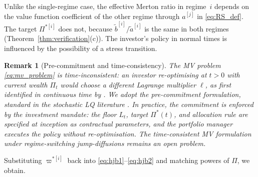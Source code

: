 \documentclass[11pt,a4paper]{article}
\numberwithin{equation}{section}
\newtheorem{remark}[theorem]{Remark}
\begin{document}
Unlike the single-regime case, the effective Merton ratio in regime~$i$ depends on the value function coefficient of the other regime through $a^{[j]}$ in \eqref{eq:RS_def}. The target $\Pi^{*[i]}$ does not, because $\tilde{b}^{[i]}/\tilde{a}^{[i]}$ is the same in both regimes (Theorem~\ref{thm:verification}(c)). The investor's policy in normal times is influenced by the possibility of a stress transition.


\begin{remark}[Pre-commitment and time-consistency]%
\label{rem:time_consistency}
The MV problem \eqref{eq:mv_problem} is time-inconsistent: an investor 
re-optimising at $t > 0$ with current wealth $\Pi_t$ would choose a 
different Lagrange multiplier $\ell$, as first identified in continuous 
time by \citet{BasakChabakauri2010}. We adopt the pre-commitment 
formulation, standard in the stochastic LQ literature 
\citep{ZhouLi2000, ZhouYin2003, ShiXu2025}. In practice, the 
commitment is enforced by the investment mandate: the floor $L_t$, 
target $\Pi^*(t)$, and allocation rule are specified at inception as 
contractual parameters, and the portfolio manager executes the policy 
without re-optimisation. The time-consistent MV formulation under 
regime-switching jump-diffusions remains an open problem.
\end{remark}


Substituting $\varpi^{*[i]}$ back into \eqref{eq:hjb1}--\eqref{eq:hjb2} and matching powers of $\Pi$, we obtain.
\end{document}
